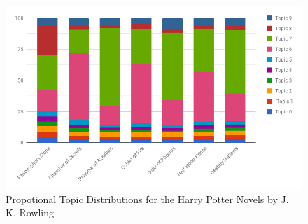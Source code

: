 \documentclass[10pt]{report}
\begin{document}
\begin{figure}[h!]
  \includegraphics[scale=0.6]{hp_topics}
  \caption{Propotional Topic Distributions for the Harry Potter Novels by J. K. Rowling \label{fig:hp_topics}}
\end{figure}

\clearpage
\end{document}
